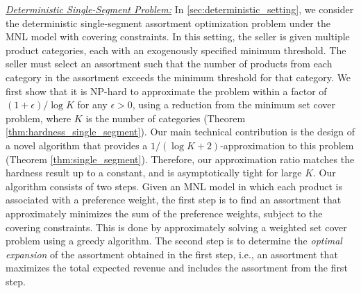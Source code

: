 \documentclass[msom,non-blindrev]{informs3} %
\theoremstyle{definition}
\begin{document}
\noindent\underline{\textit{Deterministic Single-Segment Problem:}} In \cref{sec:deterministic_setting}, we consider the deterministic single-segment assortment optimization problem under the MNL model with covering constraints. In this setting, the seller is given multiple product categories, each with an exogenously specified minimum threshold. The seller must select an assortment such that the number of products from each category in the assortment  exceeds the minimum threshold for that category. We first show that it is NP-hard to approximate the problem within a factor of \((1+\epsilon)/\log K\) for any \(\epsilon > 0\), using a reduction from the minimum set cover problem, where \(K\) is the number of categories (Theorem \ref{thm:hardness_single_segment}). Our main technical contribution is the design of a novel algorithm that provides a \(1/(\log K + 2)\)-approximation to this problem (Theorem \ref{thm:single_segment}). Therefore, our  approximation ratio matches the hardness result up to a constant, and is asymptotically tight for large \(K\).  Our algorithm consists of two steps. Given an MNL model in which each product is associated with a preference weight, the first step is to find an assortment that approximately minimizes the sum of the preference weights, subject to the covering constraints. This is done by approximately solving a weighted set cover problem using a greedy algorithm. The second step is to determine the \textit{optimal expansion} of the assortment obtained in the first step, i.e., an assortment that maximizes the total expected revenue and includes the assortment from the first step. %
\end{document}
